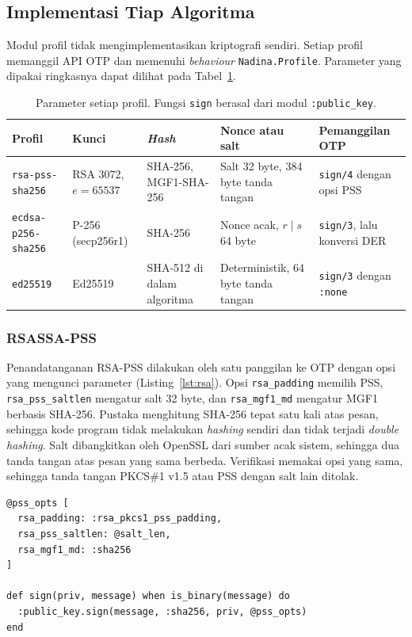 \subsection{Implementasi Tiap Algoritma}
Modul profil tidak mengimplementasikan kriptografi sendiri. Setiap profil memanggil API OTP dan
memenuhi \textit{behaviour} \texttt{Nadina.Profile}. Parameter yang dipakai ringkasnya dapat dilihat
pada Tabel~\ref{tab:profil}.

\begin{table}[H]
\centering
{\small
\begin{tabular}{@{}p{3.9cm}p{2.5cm}p{2.3cm}p{3.0cm}p{3.4cm}@{}}
\toprule
Profil & Kunci & \textit{Hash} & Nonce atau salt & Pemanggilan OTP \\
\midrule
\texttt{rsa-pss-sha256} & RSA 3072, $e = 65537$ & SHA-256, MGF1-SHA-256 & Salt 32 byte, 384 byte tanda tangan & \texttt{sign/4} dengan opsi PSS \\
\texttt{ecdsa-p256-sha256} & P-256 (secp256r1) & SHA-256 & Nonce acak, $r \mid s$ 64 byte & \texttt{sign/3}, lalu konversi DER \\
\texttt{ed25519} & Ed25519 & SHA-512 di dalam algoritma & Deterministik, 64 byte tanda tangan & \texttt{sign/3} dengan \texttt{:none} \\
\bottomrule
\end{tabular}}
\caption{Parameter setiap profil. Fungsi \texttt{sign} berasal dari modul \texttt{:public\_key}.}
\label{tab:profil}
\end{table}

\subsubsection*{RSASSA-PSS}
Penandatanganan RSA-PSS dilakukan oleh satu panggilan ke OTP dengan opsi yang mengunci parameter
(Listing~\ref{lst:rsa}). Opsi \texttt{rsa\_padding} memilih PSS, \texttt{rsa\_pss\_saltlen}
mengatur salt 32 byte, dan \texttt{rsa\_mgf1\_md} mengatur MGF1 berbasis SHA-256. Pustaka
menghitung SHA-256 tepat satu kali atas pesan, sehingga kode program tidak melakukan
\textit{hashing} sendiri dan tidak terjadi \textit{double hashing}. Salt dibangkitkan oleh OpenSSL
dari sumber acak sistem, sehingga dua tanda tangan atas pesan yang sama berbeda. Verifikasi memakai
opsi yang sama, sehingga tanda tangan PKCS\#1 v1.5 atau PSS dengan salt lain ditolak.

\begin{lstlisting}[basicstyle=\ttfamily\footnotesize,caption={Penandatanganan RSA-PSS pada profil \texttt{rsa-pss-sha256}},label={lst:rsa},numbers=none]
@pss_opts [
  rsa_padding: :rsa_pkcs1_pss_padding,
  rsa_pss_saltlen: @salt_len,
  rsa_mgf1_md: :sha256
]

def sign(priv, message) when is_binary(message) do
  :public_key.sign(message, :sha256, priv, @pss_opts)
end
\end{lstlisting}

